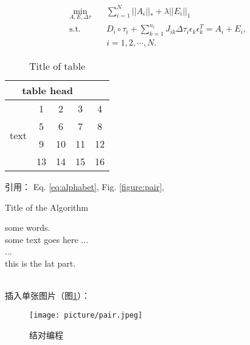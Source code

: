 \documentclass[UTF8,a4paper,12pt]{ctexart}
\newcommand{\reffig}[1]{（图\ref{#1}）}
\begin{document}
 \begin{equation}
 \begin{aligned} \label{eq:rasl}
 \min_{A,E,\Delta \tau} \quad & \sum_{i=1}^{N}||A_i||_* + \lambda ||E_i||_1  \\
 \mathrm{s.t.} \quad & D_i \circ \tau_i + \sum_{k=1}^{n_i} J_{ik} \Delta \tau_i \epsilon_k \epsilon_k^T = A_i + E_i, \\
 & i = 1,2,\cdots,N. 
 \end{aligned}
 \end{equation}
 
 \begin{table}[htbp]
 	\caption{Title of table} \label{tab:table}
 	\centering
 	\addtolength{\tabcolsep}{-0mm} %
 	\begin{tabular}{ccccc}
 		\toprule[0.75pt]	%
 		\multicolumn{4}{c}{table head} \\
 		\midrule[0.5pt]	%
 		\multirow{4}{*}{text} & 1 & 2 & 3 & 4 \\  %
 		& 5 & 6 & 7 & 8 \\
 		\cmidrule[0.5pt]{2-4}	%
 		& 9 & 10 & 11 & 12 \\
 		& 13 & 14 & 15 & 16 \\
 		\bottomrule[0.75pt]	%
 	\end{tabular}
 \end{table}
 引用： Eq. \eqref{eq:alphabet}, Fig. \ref{figure:pair},  \\
 
 
 \begin{algorithm}
 	\caption{Title of the Algorithm}
 	\label{algo:ref}
 	\begin{algorithmic}[1]
 		\REQUIRE some words.  %
 		\ENSURE ~\\           %
 		some text goes here ... \\
 		\STATE ... \\  %
 		\ENDWHILE
 		\RETURN this is the lat part.  %
 	\end{algorithmic}
 \end{algorithm}
 
 ~\\ %
 
 插入单张图片\reffig{fig:pair}：
 
  \begin{figure}[htbp]
  	\centering
  	\texttt{[image: picture/pair.jpeg]} 
  	\caption{结对编程} %
  	\label{fig:pair} %
  \end{figure}
  
\end{document}
